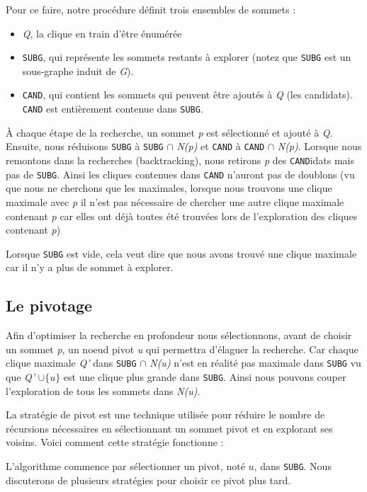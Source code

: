 \documentclass[12pt,a4paper]{article}
\begin{document}
Pour ce faire, notre procédure définit trois ensembles de sommets :
\begin{itemize}
  \item \emph{Q}, la clique en train d'être énumérée
  \item \texttt{SUBG}, qui représente les sommets restants à explorer (notez que \texttt{SUBG} est un sous-graphe induit de \emph{G}).
  \item \texttt{CAND}, qui contient les sommets qui peuvent être ajoutés à \emph{Q} (les candidats). \texttt{CAND} est entièrement contenue dans \texttt{SUBG}.
\end{itemize}
À chaque étape de la recherche, un sommet \emph{p} est sélectionné et ajouté à \emph{Q}.  Ensuite, nous réduisons \texttt{SUBG} à \texttt{SUBG} \(\cap\) \emph{N(p)} et \texttt{CAND} à \texttt{CAND} \(\cap\) \emph{N(p)}. Lorsque nous remontons dans la recherches (backtracking), nous retirons \emph{p} des \texttt{CAND}idats mais pas de \texttt{SUBG}. Ainsi les cliques contenues dans \texttt{CAND} n'auront pas de doublons (vu que nous ne cherchons que les maximales, lorsque nous trouvons une clique maximale avec \emph{p} il n'est pas nécessaire de chercher une autre clique maximale contenant \emph{p} car elles ont déjà toutes été trouvées lors de l'exploration des cliques contenant \emph{p})

Lorsque \texttt{SUBG} est vide, cela veut dire que nous avons trouvé une clique maximale car il n'y a plus de sommet à explorer.

\subsection{Le pivotage}%
\label{subsec:pivotage}


Afin d'optimiser la recherche en profondeur nous sélectionnons, avant de choisir un sommet \emph{p}, un noeud pivot \emph{u} qui permettra d'élaguer la recherche. Car chaque clique maximale \emph{Q'} dans \texttt{SUBG} \(\cap\) \emph{N(u)} n'est en réalité pas maximale dans \texttt{SUBG} vu que \emph{Q'} \(\cup \{u\}\) est une clique plus grande dans \texttt{SUBG}. Ainsi nous pouvons couper l'exploration de tous les sommets dans \emph{N(u)}.


La stratégie de pivot est une technique utilisée pour réduire le nombre de récursions nécessaires en sélectionnant un sommet pivot et en explorant ses voisins. Voici comment cette stratégie fonctionne :

L'algorithme commence par sélectionner un pivot, noté \( u \), dans \texttt{SUBG}. Nous discuterons de plusieurs stratégies pour choisir ce pivot plus tard.
\end{document}
